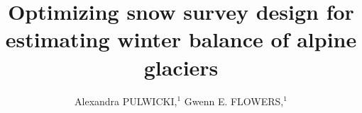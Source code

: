 \documentclass[twocolumn,letterpaper]{igs}
\begin{document}
\title[Optimizing snow survey design for winter balance]{Optimizing snow survey design for estimating winter balance of alpine glaciers}

\author[Pulwicki and Flowers]{Alexandra PULWICKI,$^1$
  Gwenn E. FLOWERS,$^1$}




\end{document}
